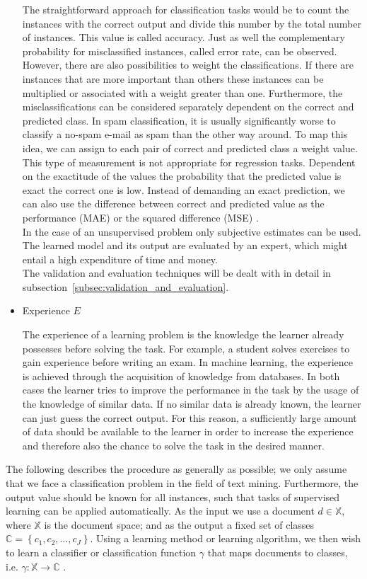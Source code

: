 \documentclass[article,type=msc,colorback,accentcolor=tud7b]{tudthesis}
\begin{document}
\begin{itemize}
        The straightforward approach for classification tasks would be to count the instances with the correct output and divide this number by the total number of instances. This value is called accuracy. Just as well the complementary probability for misclassified instances, called error rate, can be observed. However, there are also possibilities to weight the classifications. If there are instances that are more important than others these instances can be multiplied or associated with a weight greater than one. Furthermore, the misclassifications can be considered separately dependent on the correct and predicted class. In spam classification, it is usually significantly worse to classify a no-spam e-mail as spam than the other way around. To map this idea, we can assign to each pair of correct and predicted class a weight value. \\
        This type of measurement is not appropriate for regression tasks. Dependent on the exactitude of the values the probability that the predicted value is exact the correct one is low. Instead of demanding an exact prediction, we can also use the difference between correct and predicted value as the performance (MAE) or the squared difference (MSE) \autocite[Chapter~5.8]{Witten2005}. \\
        In the case of an unsupervised problem only subjective estimates can be used. The learned model and its output are evaluated by an expert, which might entail a high expenditure of time and money. \\
        The validation and evaluation techniques will be dealt with in detail in subsection~\ref{subsec:validation_and_evaluation}.
      \item Experience $E$
      
        The experience of a learning problem is the knowledge the learner already possesses before solving the task. For example, a student solves exercises to gain experience before writing an exam. In machine learning, the experience is achieved through the acquisition of knowledge from databases. In both cases the learner tries to improve the performance in the task by the usage of the knowledge of similar data. If no similar data is already known, the learner can just guess the correct output. For this reason, a sufficiently large amount of data should be available to the learner in order to increase the experience and therefore also the chance to solve the task in the desired manner.
    \end{itemize}
    The following describes the procedure as generally as possible; we only assume that we face a classification problem in the field of text mining. Furthermore, the output value should be known for all instances, such that tasks of supervised learning can be applied automatically. As the input we use a document $d\in\mathbb{X}$, where $\mathbb{X}$ is the document space; and as the output a fixed set of classes $\mathbb{C}=\left\{c_{1},c_{2},\dots,c_{J}\right\}$. Using a learning method or learning algorithm, we then wish to learn a classifier or classification function $\gamma$ that maps documents to classes, i.e. $\gamma:\mathbb{X}\rightarrow\mathbb{C}$ \autocite[Chapter~13.1]{Manning2008}.
  
\end{document}
